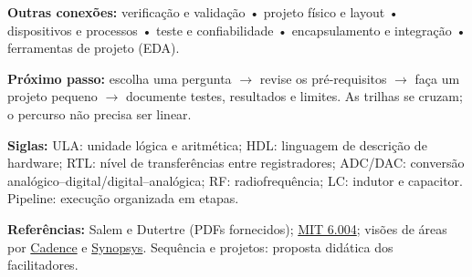 \documentclass[10pt,a4paper]{article}
\begin{document}
\begin{minipage}[t]{.19\linewidth}\vspace{0pt}
\end{minipage}\hfill
\begin{minipage}[t]{.19\linewidth}\vspace{0pt}
\end{minipage}\par
\endgroup
\vspace{1mm}
\textbf{Outras conexões:} verificação e validação • projeto físico e layout • dispositivos e processos • teste e confiabilidade • encapsulamento e integração • ferramentas de projeto (EDA).

\colorbox{ouro!20}{\parbox{\dimexpr\linewidth-2\fboxsep}{\textbf{Próximo passo:} escolha uma pergunta $\rightarrow$ revise os pré-requisitos $\rightarrow$ faça um projeto pequeno $\rightarrow$ documente testes, resultados e limites. As trilhas se cruzam; o percurso não precisa ser linear.}}

{\footnotesize\textbf{Siglas:} ULA: unidade lógica e aritmética; HDL: linguagem de descrição de hardware; RTL: nível de transferências entre registradores; ADC/DAC: conversão analógico--digital/digital--analógica; RF: radiofrequência; LC: indutor e capacitor. Pipeline: execução organizada em etapas.\par
\textbf{Referências:} Salem e Dutertre (PDFs fornecidos); \href{https://ocw.mit.edu/courses/6-004-computation-structures-spring-2017/}{MIT 6.004}; visões de áreas por \href{https://www.cadence.com/en_US/home/explore/what-is-ic-design.html}{Cadence} e \href{https://www.synopsys.com/glossary/what-is-mixed-signal-integrated-circuit.html}{Synopsys}. Sequência e projetos: proposta didática dos facilitadores.}
\end{document}
